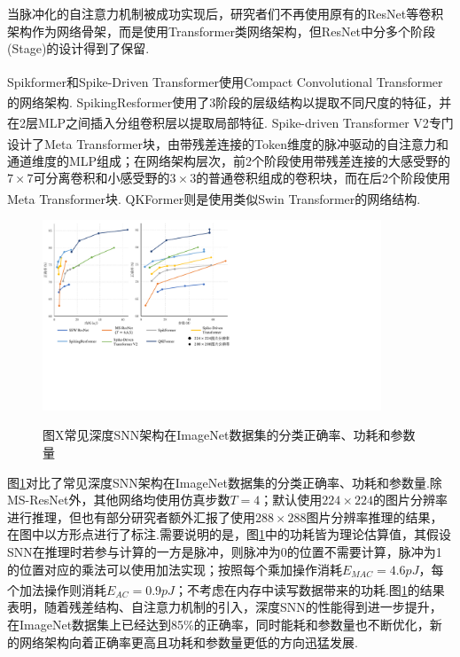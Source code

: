 \documentclass[10.5pt,compsoc,UTF8]{CjC}
\theoremstyle{mystyle}
\newcommand{\upcite}[1]{\textsuperscript{\cite{#1}}}
\begin{document}
\begin{multicols}{1}
当脉冲化的自注意力机制被成功实现后，研究者们不再使用原有的ResNet等卷积架构作为网络骨架，而是使用Transformer类网络架构，但ResNet中分多个阶段(Stage)的设计得到了保留.

Spikformer\upcite{zhou2023spikformer}和Spike-Driven Transformer\upcite{NEURIPS2023_ca0f5358}使用Compact Convolutional Transformer\upcite{hassani2022escapingbigdataparadigm}的网络架构.
SpikingResformer\upcite{Shi_2024_CVPR}使用了3阶段的层级结构以提取不同尺度的特征，并在2层MLP之间插入分组卷积层以提取局部特征.
Spike-driven Transformer V2\upcite{yao2024spikedriven}专门设计了Meta Transformer块，由带残差连接的Token维度的脉冲驱动的自注意力\upcite{NEURIPS2023_ca0f5358}和通道维度的MLP组成；在网络架构层次，前2个阶段使用带残差连接的大感受野的$7\times7$可分离卷积和小感受野的$3\times3$的普通卷积组成的卷积块，而在后2个阶段使用Meta Transformer块.
QKFormer\upcite{zhou2024qkformerhierarchicalspikingtransformer}则是使用类似Swin Transformer\upcite{liu2021swin}的网络结构.

\begin{figure}[H]
	\centerline{\includegraphics[width=0.9\textwidth,trim=0 180 430 20,clip]{./data/structure_pow_param_acc.pdf}}
	{图X\quad 常见深度SNN架构在ImageNet数据集的分类正确率、功耗和参数量}
	\label{fig: network structure pow param acc}
\end{figure}

图\ref{fig: network structure pow param acc}对比了常见深度SNN架构在ImageNet数据集的分类正确率、功耗和参数量.除MS-ResNet外，其他网络均使用仿真步数$T=4$；默认使用$224\times224$的图片分辨率进行推理，但也有部分研究者额外汇报了使用$288\times288$图片分辨率推理的结果，在图中以方形点进行了标注.需要说明的是，图\ref{fig: network structure pow param acc}中的功耗皆为理论估算值，其假设SNN在推理时若参与计算的一方是脉冲，则脉冲为0的位置不需要计算，脉冲为1的位置对应的乘法可以使用加法实现；按照每个乘加操作消耗$E_{MAC}=4.6pJ$，每个加法操作则消耗$E_{AC}=0.9pJ$\upcite{6757323}；不考虑在内存中读写数据带来的功耗.图\ref{fig: network structure pow param acc}的结果表明，随着残差结构、自注意力机制的引入，深度SNN的性能得到进一步提升，在ImageNet数据集上已经达到85\%的正确率，同时能耗和参数量也不断优化，新的网络架构向着正确率更高且功耗和参数量更低的方向迅猛发展.




\end{multicols}
\end{document}
